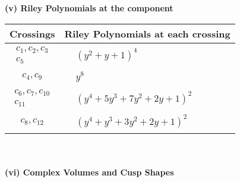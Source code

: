 \documentclass[1p]{elsarticle_modified}
\theoremstyle{definition}
\begin{document}
\newpage\renewcommand{\arraystretch}{1}
\flushleft \textbf{(v) Riley Polynomials at the component}\newline \\
\begin{tabular}{m{50pt}|m{274pt}}
Crossings & \hspace{64pt}Riley Polynomials at each crossing \\
\hline $$\begin{aligned}c_{1},c_{2},c_{3}\\c_{5}\end{aligned}$$&$\begin{aligned}
&(y^2+y+1)^4
\end{aligned}$\\
\hline $$\begin{aligned}c_{4},c_{9}\end{aligned}$$&$\begin{aligned}
&y^8
\end{aligned}$\\
\hline $$\begin{aligned}c_{6},c_{7},c_{10}\\c_{11}\end{aligned}$$&$\begin{aligned}
&(y^4+5 y^3+7 y^2+2 y+1)^2
\end{aligned}$\\
\hline $$\begin{aligned}c_{8},c_{12}\end{aligned}$$&$\begin{aligned}
&(y^4+y^3+3 y^2+2 y+1)^2
\end{aligned}$\\
\hline
\end{tabular}\\~\\
\newpage\flushleft \textbf{(vi) Complex Volumes and Cusp Shapes}
\end{document}
